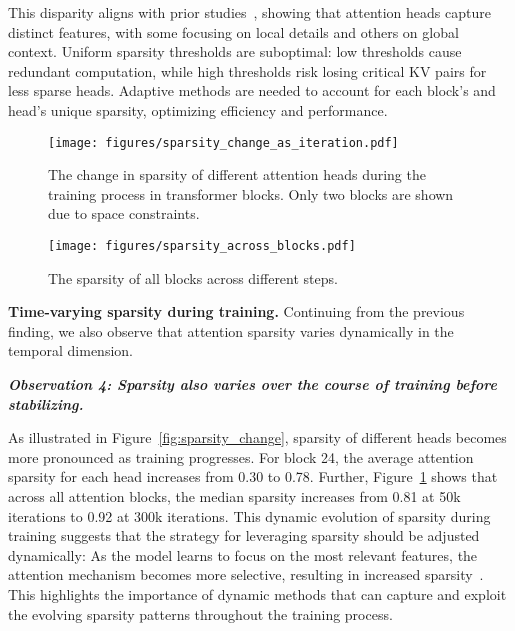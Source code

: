 This disparity aligns with prior studies~\cite{waswani2017attention,jin2024mohattentionmoe,li2019informationattention}, showing that attention heads capture distinct features, with some focusing on local details and others on global context. Uniform sparsity thresholds are suboptimal: low thresholds cause redundant computation, while high thresholds risk losing critical KV pairs for less sparse heads. Adaptive methods are needed to account for each block's and head's unique sparsity, optimizing efficiency and performance.




\begin{figure}[t]
    \centering
    \begin{minipage}[t]{0.335\textwidth}
       \vspace{0pt} %
       \centering
  \texttt{[image: figures/sparsity\_change\_as\_iteration.pdf]}

\caption{The change in sparsity of different attention heads during the training process in transformer blocks. Only two blocks are shown due to space constraints. }
  \label{fig:sparsity_change} 
    \end{minipage}
    \hfill
    \hspace{-0.25in}
    \begin{minipage}[t]{0.135\textwidth}
       \vspace{0pt} %
      \centering
  \texttt{[image: figures/sparsity\_across\_blocks.pdf]} 

  \caption{The sparsity of all blocks across different steps.}
  \label{fig:sparsity_across_blocks} 
    \end{minipage}
   
\end{figure}



\noindent\textbf{Time-varying sparsity during training.} 
Continuing from the previous finding, we also observe that attention sparsity varies dynamically in the temporal dimension.

\hypertarget{obs4}{
\textbf{\textit{Observation 4: Sparsity also varies over the course of training before stabilizing.}}}

As illustrated in Figure~\ref{fig:sparsity_change}, sparsity of different heads becomes more pronounced as training progresses. For block 24, the average attention sparsity for each head increases from 0.30 to 0.78. Further, Figure~\ref{fig:sparsity_across_blocks} shows that across all attention blocks, the median sparsity increases from 0.81 at 50k iterations to 0.92 at 300k iterations.
This dynamic evolution of sparsity during training suggests that the strategy for leveraging sparsity should be adjusted dynamically: As the model learns to focus on the most relevant features, the attention mechanism becomes more selective, resulting in increased sparsity~\cite{vig2019analyzingatten}. This highlights the importance of dynamic methods that can capture and exploit the evolving sparsity patterns throughout the training process. 

